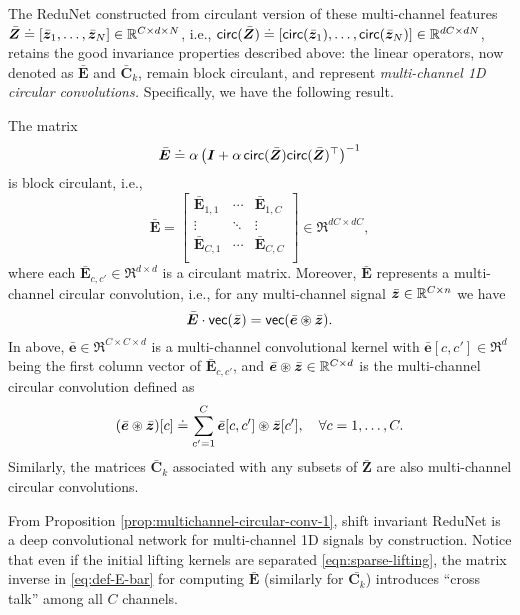 \documentclass[\toplevelprefix/book-main.tex]{subfiles}
\begin{document}
The ReduNet constructed from circulant version of these multi-channel features $\bar{\bm{Z}} \doteq [\bar {\bm{z}}_1, \ldots, \bar {\bm{z}}_N] \in \mathbb{R}^{C \times d \times N}$, i.e., $\mathsf{circ}(\bar{\bm{Z}}) \doteq [ \mathsf{circ}(\bar{\bm{z}}_1), \dots, \mathsf{circ}(\bar{\bm{z}}_N)] \in \mathbb{R}^{dC \times dN}$, retains the good invariance properties described above: the linear operators, now denoted as $\bar{\bm E}$ and $\bar{\bm C}_k$, remain block circulant, and represent {\em multi-channel 1D circular convolutions. }
Specifically, we have the following result.
\begin{proposition}
The matrix 
\begin{equation}
\label{eq:def-E-bar}
\bar{\bm E} \doteq \alpha\left(\bm I + \alpha\, \mathsf{circ}(\bar{\bm{Z}}) \mathsf{circ}(\bar{\bm{Z}})^\top \right) ^{-1}  
\end{equation}
is block circulant, i.e.,
\begin{equation*}
    \bar{\bm E} = 
    \left[\begin{matrix}
        \bar{\bm E}_{1, 1} & \cdots & \bar{\bm E}_{1, C}\\
        \vdots & \ddots & \vdots \\
        \bar{\bm E}_{C, 1} & \cdots & \bar{\bm E}_{C, C}\\
    \end{matrix}\right] \in \Re^{dC \times dC},
\end{equation*}
where each $\bar{\bm E}_{c, c'}\in \Re^{d \times d}$ is a circulant matrix. Moreover, $\bar{\bm E}$ represents a multi-channel circular convolution, i.e., for any multi-channel signal $\bar{\bm{z}} \in \mathbb{R}^{C \times n}$ we have 
$$\bar{\bm E} \cdot \textsf{vec}(\bar{\bm{z}}) = \textsf{vec}( \bar{\bm e} \circledast \bar{\bm{z}}).$$ 
In above, $\bar{\bm e} \in \Re^{C \times C \times d}$ is a multi-channel convolutional kernel with $\bar{\bm e}[c, c'] \in \Re^{d}$ being the first column vector of $\bar{\bm E}_{c, c'}$, and $\bar{\bm e} \circledast \bar{\bm{z}} \in \mathbb{R}^{C \times d}$ is the multi-channel circular convolution defined as
\begin{equation*}
    (\bar{\bm e} \circledast \bar{\bm{z}})[c] \doteq \sum_{c'=1}^C \bar{\bm e}[c, c'] \circledast \bar{\bm{z}}[c'], \quad \forall c = 1, \ldots, C.
\end{equation*}
Similarly, the matrices $\bar{\bm C}_k$ associated with any subsets of $\bar{\bm Z}$ are also multi-channel circular convolutions. 
\label{prop:multichannel-circular-conv-1}
\end{proposition}
From Proposition \ref{prop:multichannel-circular-conv-1}, shift invariant ReduNet is a deep convolutional network for multi-channel 1D signals by construction. Notice that even if the initial lifting kernels are separated \eqref{eqn:sparse-lifting}, the matrix inverse  in \eqref{eq:def-E-bar} for computing $\bar{\bm E}$ (similarly for $\bar{\bm C_k}$) introduces ``cross talk'' among all $C$ channels. %
\end{document}

